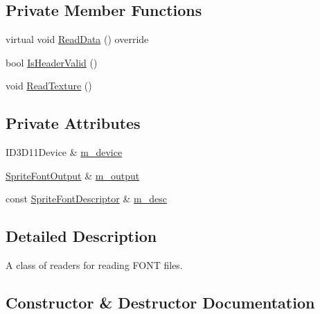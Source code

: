 \subsection*{Private Member Functions}
\begin{DoxyCompactItemize}
\item 
virtual void \mbox{\hyperlink{classmage_1_1rendering_1_1loader_1_1_sprite_font_reader_ae5b827dade3bd800e2000788efa91e30}{Read\+Data}} () override
\item 
bool \mbox{\hyperlink{classmage_1_1rendering_1_1loader_1_1_sprite_font_reader_a0523d92193229bced5669791524e4ea9}{Is\+Header\+Valid}} ()
\item 
void \mbox{\hyperlink{classmage_1_1rendering_1_1loader_1_1_sprite_font_reader_af43be711f30780c23c9bec7d2ed48feb}{Read\+Texture}} ()
\end{DoxyCompactItemize}
\subsection*{Private Attributes}
\begin{DoxyCompactItemize}
\item 
I\+D3\+D11\+Device \& \mbox{\hyperlink{classmage_1_1rendering_1_1loader_1_1_sprite_font_reader_a2d152614490f697a9d737aae446a84c9}{m\+\_\+device}}
\item 
\mbox{\hyperlink{structmage_1_1rendering_1_1_sprite_font_output}{Sprite\+Font\+Output}} \& \mbox{\hyperlink{classmage_1_1rendering_1_1loader_1_1_sprite_font_reader_ab14aaeb914ddc7f448ae8fe5ce021d3a}{m\+\_\+output}}
\item 
const \mbox{\hyperlink{classmage_1_1rendering_1_1_sprite_font_descriptor}{Sprite\+Font\+Descriptor}} \& \mbox{\hyperlink{classmage_1_1rendering_1_1loader_1_1_sprite_font_reader_af346b7f0f090f5c9994d60684ccb5960}{m\+\_\+desc}}
\end{DoxyCompactItemize}


\subsection{Detailed Description}
A class of readers for reading F\+O\+NT files. 

\subsection{Constructor \& Destructor Documentation}
\mbox{\label{classmage_1_1rendering_1_1loader_1_1_sprite_font_reader_a5cef04ca33ef0047664fa757de6e1b8f}} 
